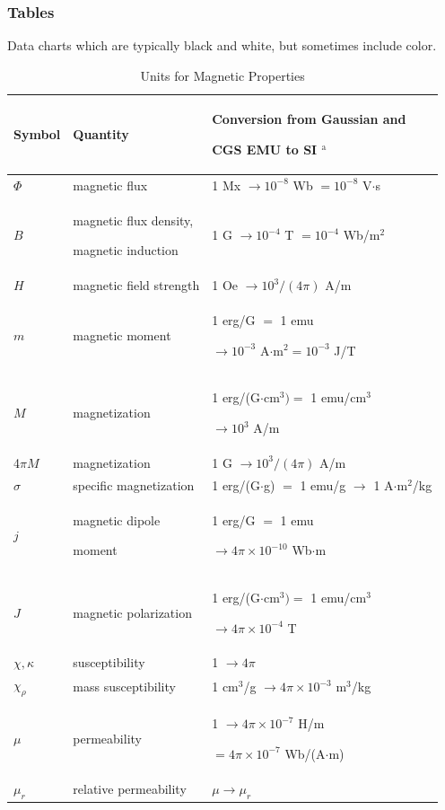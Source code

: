 \documentclass[twoside,web]{ieeecolor}
\begin{document}
\subsubsection{Tables}
{Data charts which are typically black and white, but sometimes include 
color.}

\begin{table}
\caption{Units for Magnetic Properties}
\label{table}
\setlength{\tabcolsep}{3pt}
\begin{tabular}{|p{25pt}|p{75pt}|p{115pt}|}
\hline
Symbol& 
Quantity& 
Conversion from Gaussian and \par CGS EMU to SI $^{\mathrm{a}}$ \\
\hline
$\Phi $& 
magnetic flux& 
1 Mx $\to  10^{-8}$ Wb $= 10^{-8}$ V$\cdot $s \\
$B$& 
magnetic flux density, \par magnetic induction& 
1 G $\to  10^{-4}$ T $= 10^{-4}$ Wb/m$^{2}$ \\
$H$& 
magnetic field strength& 
1 Oe $\to  10^{3}/(4\pi )$ A/m \\
$m$& 
magnetic moment& 
1 erg/G $=$ 1 emu \par $\to 10^{-3}$ A$\cdot $m$^{2} = 10^{-3}$ J/T \\
$M$& 
magnetization& 
1 erg/(G$\cdot $cm$^{3}) =$ 1 emu/cm$^{3}$ \par $\to 10^{3}$ A/m \\
4$\pi M$& 
magnetization& 
1 G $\to  10^{3}/(4\pi )$ A/m \\
$\sigma $& 
specific magnetization& 
1 erg/(G$\cdot $g) $=$ 1 emu/g $\to $ 1 A$\cdot $m$^{2}$/kg \\
$j$& 
magnetic dipole \par moment& 
1 erg/G $=$ 1 emu \par $\to 4\pi \times  10^{-10}$ Wb$\cdot $m \\
$J$& 
magnetic polarization& 
1 erg/(G$\cdot $cm$^{3}) =$ 1 emu/cm$^{3}$ \par $\to 4\pi \times  10^{-4}$ T \\
$\chi , \kappa $& 
susceptibility& 
1 $\to  4\pi $ \\
$\chi_{\rho }$& 
mass susceptibility& 
1 cm$^{3}$/g $\to  4\pi \times  10^{-3}$ m$^{3}$/kg \\
$\mu $& 
permeability& 
1 $\to  4\pi \times  10^{-7}$ H/m \par $= 4\pi \times  10^{-7}$ Wb/(A$\cdot $m) \\
$\mu_{r}$& 
relative permeability& 
$\mu \to \mu_{r}$ \\

\end{tabular}
\end{table}
\end{document}
